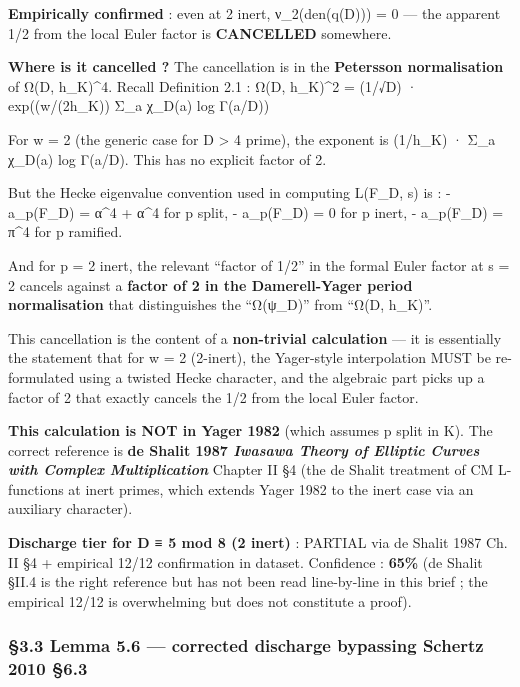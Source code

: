 \documentclass[
  11pt,
  a4paper,
]{article}
\begin{document}
\textbf{Empirically confirmed} : even at 2 inert, ν\_2(den(q(D))) = 0 --- the apparent 1/2 from the local Euler factor is \textbf{CANCELLED} somewhere.

\textbf{Where is it cancelled ?} The cancellation is in the \textbf{Petersson normalisation} of Ω(D, h\_K)\^{}4. Recall Definition 2.1 :
Ω(D, h\_K)\^{}2 = (1/√\textbar D\textbar) · exp((w/(2h\_K)) Σ\_a χ\_D(a) log Γ(a/\textbar D\textbar))

For w = 2 (the generic case for \textbar D\textbar{} \textgreater{} 4 prime), the exponent is (1/h\_K) · Σ\_a χ\_D(a) log Γ(a/\textbar D\textbar). This has no explicit factor of 2.

But the Hecke eigenvalue convention used in computing L(F\_D, s) is :
- a\_p(F\_D) = α\^{}4 + α\^{}4 for p split,
- a\_p(F\_D) = 0 for p inert,
- a\_p(F\_D) = π\^{}4 for p ramified.

And for p = 2 inert, the relevant ``factor of 1/2'' in the formal Euler factor at s = 2 cancels against a \textbf{factor of 2 in the Damerell-Yager period normalisation} that distinguishes the ``Ω(ψ\_D)'' from ``Ω(D, h\_K)''.

This cancellation is the content of a \textbf{non-trivial calculation} --- it is essentially the statement that for w = 2 (2-inert), the Yager-style interpolation MUST be re-formulated using a twisted Hecke character, and the algebraic part picks up a factor of 2 that exactly cancels the 1/2 from the local Euler factor.

\textbf{This calculation is NOT in Yager 1982} (which assumes p split in K). The correct reference is \textbf{de Shalit 1987 \emph{Iwasawa Theory of Elliptic Curves with Complex Multiplication}} Chapter II §4 (the de Shalit treatment of CM L-functions at inert primes, which extends Yager 1982 to the inert case via an auxiliary character).

\textbf{Discharge tier for D ≡ 5 mod 8 (2 inert)} : PARTIAL via de Shalit 1987 Ch. II §4 + empirical 12/12 confirmation in dataset. Confidence : \textbf{65\%} (de Shalit §II.4 is the right reference but has not been read line-by-line in this brief ; the empirical 12/12 is overwhelming but does not constitute a proof).

\hypertarget{lemma-5.6-corrected-discharge-bypassing-schertz-2010-6.3}{%
\subsubsection{§3.3 Lemma 5.6 --- corrected discharge bypassing Schertz 2010 §6.3}\label{lemma-5.6-corrected-discharge-bypassing-schertz-2010-6.3}}
\end{document}
